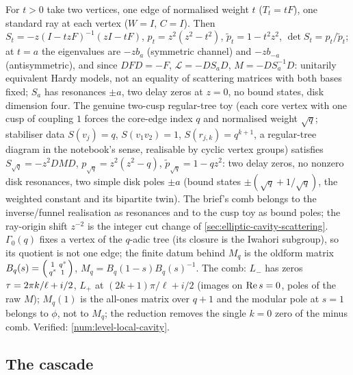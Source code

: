 \begin{proposition}
\label{prop:local-inverse-weighted-edge}
For $t>0$ take two vertices, one edge of normalised weight $t$ ($T_t = tF$), one standard ray at each vertex ($W = I$, $C = I$).
Then $S_t = -z(I-tzF)^{-1}(zI-tF)$, $p_t = z^2(z^2-t^2)$, $\tilde p_t = 1-t^2z^2$, $\det S_t = p_t/\tilde p_t$; at $t = a$ the eigenvalues
are $-zb_a$ (symmetric channel) and $-zb_{-a}$ (antisymmetric), and since $DFD = -F$,
$\mathcal L = -DS_aD$, $M = -DS_a^{-1}D$: unitarily equivalent Hardy models, not an equality of scattering matrices with both
bases fixed; $S_a$ has resonances $\pm a$, two delay zeros at $z = 0$, no bound states, disk dimension four. The genuine
two-cusp regular-tree toy (each core vertex with one cusp of coupling $1$ forces the core-edge index $q$ and normalised
weight $\sqrt q$; stabiliser data $S(v_j) = q$, $S(v_1v_2) = 1$, $S(r_{j,k}) = q^{k+1}$, a regular-tree diagram in the notebook's
sense, realisable by cyclic vertex groups) satisfies $S_{\sqrt q} = -z^2DMD$, $p_{\sqrt q} = z^2(z^2-q)$, $\tilde p_{\sqrt q} = 1-qz^2$:
two delay zeros, no nonzero disk resonances, two simple disk poles $\pm a$ (bound states $\pm(\sqrt q+1/\sqrt q)$, the
weighted constant and its bipartite twin). The brief's comb belongs to the inverse/funnel realisation as resonances and to
the cusp toy as bound poles; the ray-origin shift $z^{-2}$ is the integer cut change of \cref{sec:elliptic-cavity-scattering}.
$\Gamma_0(q)$ fixes a vertex of the $q$-adic tree (its closure is the Iwahori subgroup), so its quotient is not one edge; the
finite datum behind $M_q$ is the oldform matrix $B_q(s) = \begin{psmallmatrix}1&q^s\\q^s&1\end{psmallmatrix}$, $M_q = B_q(1-s)B_q(s)^{-1}$.
The comb: $L_-$ has zeros $\tau = 2\pi k/\ell+i/2$, $L_+$ at $(2k+1)\pi/\ell+i/2$ (images on $\operatorname{Re} s = 0$, poles of the raw $M$);
$M_q(1)$ is the all-ones matrix over $q+1$ and the modular pole at $s = 1$ belongs to $\phi$, not to $M_q$; the reduction removes the
single $k = 0$ zero of the minus comb. Verified: \cref{num:level-local-cavity}.
\end{proposition}

\subsection{The cascade}

